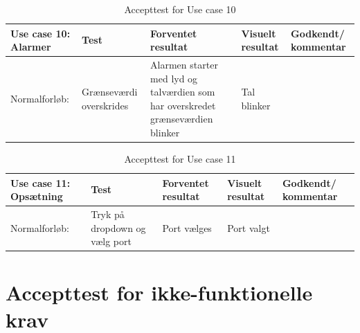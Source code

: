 \begin{table}[H]
\caption{Accepttest for Use case 10}\label{tab:tabel8}
\begin{tabular}{|>{\raggedright\arraybackslash}p{2.5cm}| >{\raggedright\arraybackslash}p{2.9cm} | >{\raggedright\arraybackslash}p{2.9cm} | >{\raggedright\arraybackslash}p{2.9cm} | >{\raggedright\arraybackslash}p{2.8cm} |}
   \hline
   \textbf{Use case 10: Alarmer } &\textbf{Test}& \textbf{Forventet resultat} & \textbf{Visuelt resultat} & \textbf{Godkendt/ kommentar}\\ \hline
   Normalforløb:& Grænseværdi overskrides& Alarmen starter med lyd og talværdien som har overskredet grænseværdien blinker & Tal blinker &\\\hline
\end{tabular}
\end{table}

\begin{table}[H]
\caption{Accepttest for Use case 11}\label{tab:tabel8}
\begin{tabular}{|>{\raggedright\arraybackslash}p{2.5cm}| >{\raggedright\arraybackslash}p{2.9cm} | >{\raggedright\arraybackslash}p{2.9cm} | >{\raggedright\arraybackslash}p{2.9cm} | >{\raggedright\arraybackslash}p{2.8cm} |}
   \hline
   \textbf{Use case 11: Opsætning } &\textbf{Test}& \textbf{Forventet resultat} & \textbf{Visuelt resultat} & \textbf{Godkendt/ kommentar}\\ \hline
   Normalforløb:& Tryk på dropdown og vælg port & Port vælges & Port valgt &\\\hline
\end{tabular}
\end{table}


\newpage

\newpage

\newpage

\newpage

\section{Accepttest for ikke-funktionelle krav}

